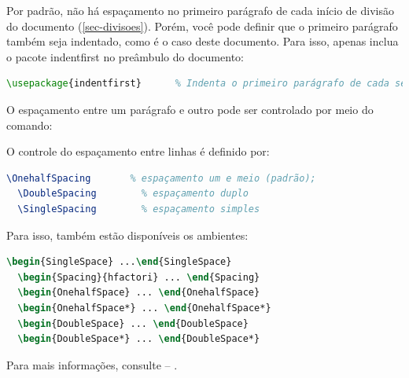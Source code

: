 Por padrão, não há espaçamento no
primeiro parágrafo de cada início de divisão do documento
(\autoref{sec-divisoes}). Porém, você pode definir que o primeiro parágrafo
também seja indentado, como é o caso deste documento. Para isso, apenas inclua o
pacote \textsf{indentfirst} no preâmbulo do documento:

\begin{lstlisting}[language=tex]
   \usepackage{indentfirst}      % Indenta o primeiro parágrafo de cada seção.
\end{lstlisting}

O espaçamento entre um parágrafo e outro
pode ser controlado por meio do comando:

\begin{verbnobox}[\small]
    \setlength{\parskip}{0.2cm}  %
\end{verbnobox}

O controle do espaçamento entre linhas é
definido por:

\begin{lstlisting}[language=tex]
  \OnehalfSpacing       % espaçamento um e meio (padrão);
  \DoubleSpacing        % espaçamento duplo
  \SingleSpacing        % espaçamento simples
\end{lstlisting}

Para isso, também estão disponíveis os ambientes:

\begin{lstlisting}[language=tex]
  \begin{SingleSpace} ...\end{SingleSpace}
  \begin{Spacing}{hfactori} ... \end{Spacing}
  \begin{OnehalfSpace} ... \end{OnehalfSpace}
  \begin{OnehalfSpace*} ... \end{OnehalfSpace*}
  \begin{DoubleSpace} ... \end{DoubleSpace}
  \begin{DoubleSpace*} ... \end{DoubleSpace*}
\end{lstlisting}

Para mais informações, consulte \textcite[p. 47-52 e 135]{memoir} -- \showfont.

